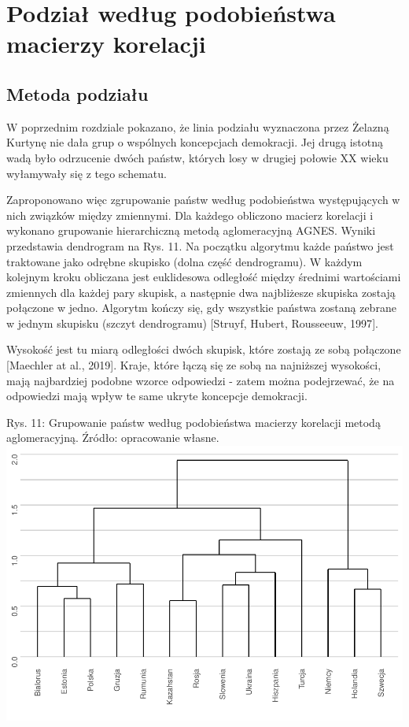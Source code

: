 \documentclass[12pt]{article}
\begin{document}
\hypertarget{podziaux142-wedux142ug-podobieux144stwa-macierzy-korelacji}{%
\section{Podział według podobieństwa macierzy korelacji}\label{podziaux142-wedux142ug-podobieux144stwa-macierzy-korelacji}}

\hypertarget{metoda-podziaux142u}{%
\subsection{Metoda podziału}\label{metoda-podziaux142u}}

W poprzednim rozdziale pokazano, że linia podziału wyznaczona przez Żelazną Kurtynę nie dała grup o wspólnych koncepcjach demokracji. Jej drugą istotną wadą było odrzucenie dwóch państw, których losy w drugiej połowie XX wieku wyłamywały się z tego schematu.

Zaproponowano więc zgrupowanie państw według podobieństwa występujących w nich związków między zmiennymi. Dla każdego obliczono macierz korelacji i wykonano grupowanie hierarchiczną metodą aglomeracyjną AGNES. Wyniki przedstawia dendrogram na Rys. 11. Na początku algorytmu każde państwo jest traktowane jako odrębne skupisko (dolna część dendrogramu). W każdym kolejnym kroku obliczana jest euklidesowa odległość między średnimi wartościami zmiennych dla każdej pary skupisk, a następnie dwa najbliżesze skupiska zostają połączone w jedno. Algorytm kończy się, gdy wszystkie państwa zostaną zebrane w jednym skupisku (szczyt dendrogramu) {[}Struyf, Hubert, Rousseeuw, 1997{]}.

Wysokość jest tu miarą odległości dwóch skupisk, które zostają ze sobą połączone {[}Maechler at al., 2019{]}. Kraje, które łączą się ze sobą na najniższej wysokości, mają najbardziej podobne wzorce odpowiedzi - zatem można podejrzewać, że na odpowiedzi mają wpływ te same ukryte koncepcje demokracji.

Rys. 11: Grupowanie państw według podobieństwa macierzy korelacji metodą aglomeracyjną. Źródło: opracowanie własne.
\includegraphics{text_ASA_files/figure-latex/dendrogram-1.pdf}
\end{document}
